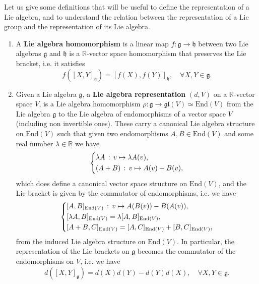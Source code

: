 \begin{definition}
    Let us give some definitions that will be useful to define the representation of a Lie algebra, and to understand the relation between the representation of a Lie group and the representation of its Lie algebra.
    \begin{enumerate}[label=(\alph*)]
        \item A \textbf{Lie algebra homomorphism} is a linear map \(f : \mathfrak{g} \to \mathfrak{h}\) between two Lie algebras \(\mathfrak{g}\) and \(\mathfrak{h}\) is a \(\mathbb{R}\)-vector space homomorphism that preserves the Lie bracket, i.e. it satisfies
              \[
                  f([X,Y]_{\mathfrak{g}}) = [f(X),f(Y)]_{\mathfrak{h}}, \quad \forall X,Y \in \mathfrak{g}.
              \]
        \item Given a Lie algebra \(\mathfrak{g}\), a \textbf{Lie algebra representation} \((d,V)\) on a \(\mathbb{R}\)-vector space \(V\), is a Lie algebra homomorphism \(\rho : \mathfrak{g} \to \mathfrak{gl}(V) \simeq \mathrm{End}(V)\) from the Lie algebra \(\mathfrak{g}\) to the Lie algebra of endomorphisms of a vector space \(V\) (including non invertible ones). These carry a canonical Lie algebra structure on \(\mathrm{End}(V)\) such that given two endomorphisms \(A,B \in \mathrm{End}(V)\) and some real number \(\lambda \in \mathbb{R}\) we have
              \[
                  \begin{dcases}
                      \lambda A \, : \, v \mapsto \lambda A(v), \\
                      (A+B) \, : \, v \mapsto A(v) + B(v),
                  \end{dcases}
              \]
              which does define a canonical vector space structure on \(\mathrm{End}(V)\), and the Lie bracket is given by the commutator of endomorphisms, i.e. we have
              \[
                  \begin{dcases}
                      [A,B]_{\mathrm{End}(V)} \, : \, v \mapsto A(B(v)) - B(A(v)),        \\
                      [\lambda A, B]_{\mathrm{End}(V)} = \lambda [A,B]_{\mathrm{End}(V)}, \\
                      [A+B, C]_{\mathrm{End}(V)} = [A,C]_{\mathrm{End}(V)} + [B,C]_{\mathrm{End}(V)},
                  \end{dcases}
              \]
              from the induced Lie algebra structure on \(\mathrm{End}(V)\). In particular, the representation of the Lie brackets on \(\mathfrak{g}\) becomes the commutator of the endomorphisms on \(V\), i.e. we have
              \[
                  d([X,Y]_{\mathfrak{g}}) = d(X) d(Y) - d(Y) d(X), \quad \forall X,Y \in \mathfrak{g}.
              \]
    \end{enumerate}
\end{definition}

